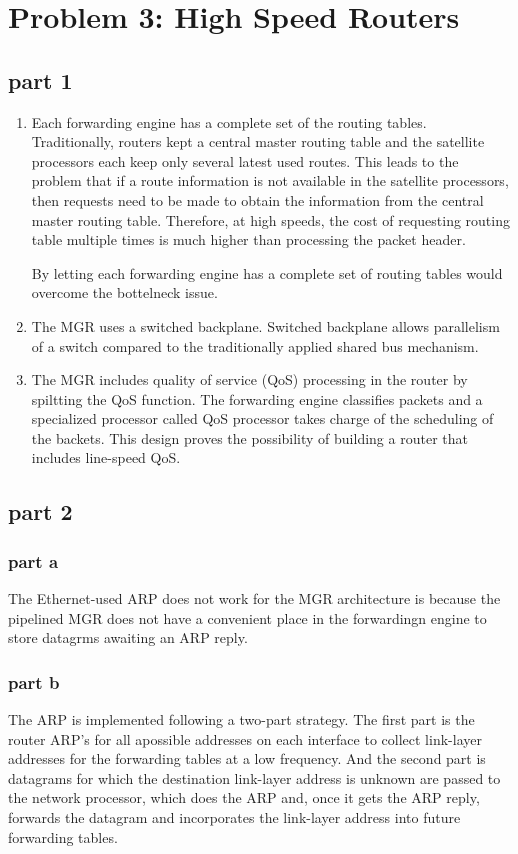 \section{Problem 3: High Speed Routers}

\subsection{part 1}

\begin{enumerate}
\item Each forwarding engine has a complete set of the routing tables. Traditionally, routers kept a central master routing table and the satellite processors each keep only several latest used routes. This leads to the problem that if a route information is not available in the satellite processors, then requests need to be made to obtain the information from the central master routing table. Therefore, at high speeds, the cost of requesting routing table multiple times is much higher than processing the packet header.

By letting each forwarding engine has a complete set of routing tables would overcome the bottelneck issue.
\item The MGR uses a switched backplane. Switched backplane allows parallelism of a switch compared to the traditionally applied shared bus mechanism.
\item The MGR includes quality of service (QoS) processing in the router by spiltting the QoS function. The forwarding engine classifies packets and a specialized processor called QoS processor takes charge of the scheduling of the backets. This design proves the possibility of building a router that includes line-speed QoS.
\end{enumerate}

\subsection{part 2}

\subsubsection{part a}
The Ethernet-used ARP does not work for the MGR architecture is because the pipelined MGR does not have a convenient place in the forwardingn engine to store datagrms awaiting an ARP reply.

\subsubsection{part b}
The ARP is implemented following a two-part strategy. The first part is the router ARP's for all apossible addresses on each interface to collect link-layer addresses for the forwarding tables at a low frequency. And the second part is datagrams for which the destination link-layer address is unknown are passed to the network processor, which does the ARP and, once it gets the ARP reply, forwards the datagram and incorporates the link-layer address into future forwarding tables.

